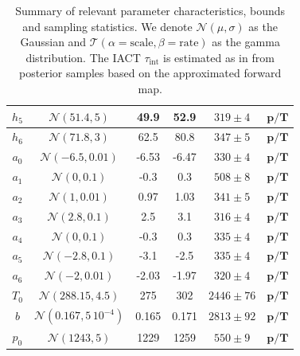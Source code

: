 \begin{table}
\begin{tabular}{ |c||c|c|c|c|c|   }
		$h_{5}$ &  $\mathcal{N}(51.4,5)$&49.9 &52.9&$319 \pm 4$&$\bm{p/T}$\\ \hline
		$h_{6}$ &  $\mathcal{N}(71.8,3)$&62.5 &80.8&$347 \pm 5$&$\bm{p/T}$\\ \hline
		$a_{0}$ &  $\mathcal{N}(-6.5,0.01)$&-6.53 &-6.47&$330 \pm 4$&$\bm{p/T}$\\ \hline
		$a_{1}$ &  $\mathcal{N}(0,0.1)$&-0.3 &0.3&$508 \pm 8$&$\bm{p/T}$\\ \hline
		$a_{2}$ &  $\mathcal{N}(1,0.01)$&0.97 &1.03&$341 \pm 5$&$\bm{p/T}$\\ \hline
		$a_{3}$ &  $\mathcal{N}(2.8,0.1)$&2.5 &3.1&$316 \pm 4$&$\bm{p/T}$\\ \hline
		$a_{4}$ &  $\mathcal{N}(0,0.1)$&-0.3 &0.3&$335 \pm 4$&$\bm{p/T}$\\ \hline
		$a_{5}$ &  $\mathcal{N}(-2.8,0.1)$&-3.1 &-2.5&$335 \pm 4$&$\bm{p/T}$\\ \hline
		$a_{6}$ & $\mathcal{N}(-2,0.01)$ &-2.03 &-1.97&$320 \pm 4$&$\bm{p/T}$\\ \hline
		$T_{0}$ &  $\mathcal{N}(288.15,4.5)$& 275 &302&$2446 \pm 76$&$\bm{p/T}$\\ \hline
		$b$ &  $\mathcal{N}(0.167,5\,10^{-4})$& 0.165& 0.171 &$2813 \pm 92$&$\bm{p/T}$\\ \hline
		$p_0$ &  $\mathcal{N}(1243,5)$&1229 &1259&$550 \pm 9$&$\bm{p/T}$\\ 
		\hline
	\end{tabular}
	\caption[Summary of relevant parameter characteristics, bounds and sampling statistics.]{Summary of relevant parameter characteristics, bounds and sampling statistics. We denote $\mathcal{N}(\mu,\sigma)$ as the Gaussian and $\mathcal{T}(\alpha = \text{scale}, \beta = \text{rate})$ as the gamma distribution. The IACT $\tau_{\text{int}}$ is estimated as in \cite{UwerrM} from posterior samples based on the approximated forward map.}
	\label{tab:priors}
\end{table}

